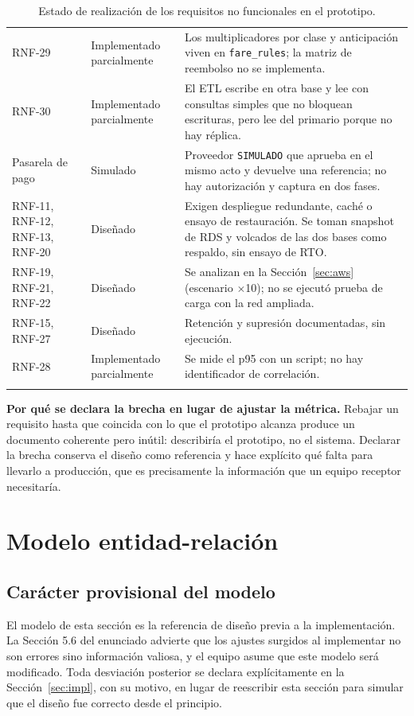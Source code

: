 \documentclass[10pt,letterpaper]{article}
\newcommand{\nota}[1]{%
  \begin{tcolorbox}[colback=cajaFondo,colframe=usaAzul!60,sharp corners=south]#1\end{tcolorbox}}
\begin{document}
\begin{longtable}{@{}L{2.6cm} L{2.8cm} L{10.4cm}@{}}
RNF-29 & Implementado parcialmente & Los multiplicadores por clase y anticipación viven en \texttt{fare\_rules}; la matriz de reembolso no se implementa. \\
RNF-30 & Implementado parcialmente & El ETL escribe en otra base y lee con consultas simples que no bloquean escrituras, pero lee del primario porque no hay réplica. \\
Pasarela de pago & Simulado & Proveedor \texttt{SIMULADO} que aprueba en el mismo acto y devuelve una referencia; no hay autorización y captura en dos fases. \\
RNF-11, RNF-12, RNF-13, RNF-20 & Diseñado & Exigen despliegue redundante, caché o ensayo de restauración. Se toman snapshot de RDS y volcados de las dos bases como respaldo, sin ensayo de RTO. \\
RNF-19, RNF-21, RNF-22 & Diseñado & Se analizan en la Sección~\ref{sec:aws} (escenario $\times$10); no se ejecutó prueba de carga con la red ampliada. \\
RNF-15, RNF-27 & Diseñado & Retención y supresión documentadas, sin ejecución. \\
RNF-28 & Implementado parcialmente & Se mide el p95 con un script; no hay identificador de correlación. \\
\bottomrule
\caption{Estado de realización de los requisitos no funcionales en el prototipo.}
\end{longtable}

\nota{\textbf{Por qué se declara la brecha en lugar de ajustar la métrica.} Rebajar un requisito hasta que coincida con lo que el prototipo alcanza produce un documento coherente pero inútil: describiría el prototipo, no el sistema. Declarar la brecha conserva el diseño como referencia y hace explícito qué falta para llevarlo a producción, que es precisamente la información que un equipo receptor necesitaría.}

\section{Modelo entidad-relación}
\label{sec:er}

\subsection{Carácter provisional del modelo}
El modelo de esta sección es la referencia de diseño previa a la implementación. La Sección 5.6 del enunciado advierte que los ajustes surgidos al implementar no son errores sino información valiosa, y el equipo asume que este modelo será modificado. Toda desviación posterior se declara explícitamente en la Sección~\ref{sec:impl}, con su motivo, en lugar de reescribir esta sección para simular que el diseño fue correcto desde el principio.
\end{document}
